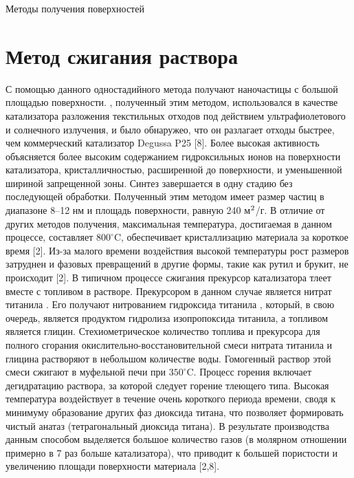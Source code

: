 \documentclass[oneside,final,12pt]{extreport}
\begin{document}
\begin{chapter} {Методы получения поверхностей }
\section{Метод сжигания раствора}

С помощью данного одностадийного метода получают наночастицы  с большой площадью поверхности. , полученный этим методом, использовался в качестве катализатора разложения текстильных отходов под действием ультрафиолетового и солнечного излучения, и было обнаружео, что он разлагает отходы быстрее, чем коммерческий катализатор Degussa P25 [8]. Более высокая активность объясняется более высоким содержанием гидроксильных ионов на поверхности катализатора, кристалличностью, расширенной до поверхности, и уменьшенной шириной запрещенной зоны. Синтез  завершается в одну стадию без последующей обработки. Полученный этим методом  имеет размер частиц в диапазоне 8–12 нм и площадь поверхности, равную 240 м$\textsuperscript{2}$/г. В отличие от других методов получения, максимальная температура, достигаемая в данном процессе, составляет $800^{\circ}$C, обеспечивает кристаллизацию материала за короткое время [2]. Из-за малого времени воздействия высокой температуры рост размеров  затруднен и фазовых превращений в другие формы, такие как рутил и брукит, не происходит [2]. В типичном процессе сжигания прекурсор катализатора тлеет вместе с топливом в растворе. Прекурсором в данном случае является нитрат титанила . Его получают нитрованием гидроксида титанила , который, в свою очередь, является продуктом гидролиза изопропоксида титанила, а топливом является глицин. Стехиометрическое количество топлива и прекурсора для полного сгорания окислительно-восстановительной смеси нитрата титанила и глицина растворяют в небольшом количестве воды. Гомогенный раствор этой смеси сжигают в муфельной печи при $350^{\circ}$C. Процесс горения включает дегидратацию раствора, за которой следует горение тлеющего типа. Высокая температура воздействует в течение очень короткого периода времени, сводя к минимуму образование других фаз диоксида титана, что позволяет формировать чистый анатаз (тетрагональный диоксида титана). В результате производства  данным способом выделяется большое количество газов (в молярном отношении примерно в 7 раз больше катализатора), что приводит к большей пористости и увеличению площади поверхности материала [2,8].
\end{chapter}

\end{document}
